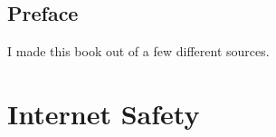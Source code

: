 \documentclass[14pt,letterpaper,oneside]{book} %
\begin{document}
	
	\frontmatter
	
	
	
	
	\chapter*{Preface}
	I made this book out of a few different sources.
	
	\newpage
	\tableofcontents
	
	\mainmatter
	
	\part{Internet Safety}
	

	
\end{document}
